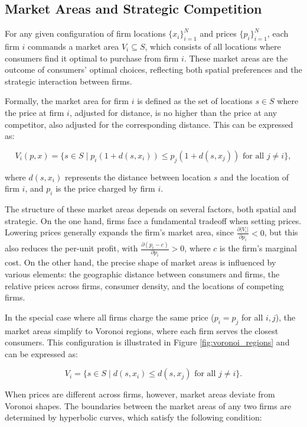 \subsection{Market Areas and Strategic Competition}

For any given configuration of firm locations $\{x_i\}_{i=1}^N$ and prices $\{p_i\}_{i=1}^N$, each firm $i$ commands a market area $V_i \subseteq S$, which consists of all locations where consumers find it optimal to purchase from firm $i$. These market areas are the outcome of consumers' optimal choices, reflecting both spatial preferences and the strategic interaction between firms.

Formally, the market area for firm $i$ is defined as the set of locations $s \in S$ where the price at firm $i$, adjusted for distance, is no higher than the price at any competitor, also adjusted for the corresponding distance. This can be expressed as:

\[
V_i(p,x) = \{ s \in S \mid p_i(1 + d(s,x_i)) \leq p_j(1 + d(s,x_j)) \text{ for all } j \neq i \},
\]

where $d(s, x_i)$ represents the distance between location $s$ and the location of firm $i$, and $p_i$ is the price charged by firm $i$.

The structure of these market areas depends on several factors, both spatial and strategic. On the one hand, firms face a fundamental tradeoff when setting prices. Lowering prices generally expands the firm's market area, since $\frac{\partial |V_i|}{\partial p_i} < 0$, but this also reduces the per-unit profit, with $\frac{\partial (p_i - c)}{\partial p_i} > 0$, where $c$ is the firm's marginal cost. On the other hand, the precise shape of market areas is influenced by various elements: the geographic distance between consumers and firms, the relative prices across firms, consumer density, and the locations of competing firms.

In the special case where all firms charge the same price ($p_i = p_j$ for all $i,j$), the market areas simplify to Voronoi regions, where each firm serves the closest consumers. This configuration is illustrated in Figure \ref{fig:voronoi_regions} and can be expressed as:

\[
V_i = \{ s \in S \mid d(s,x_i) \leq d(s,x_j) \text{ for all } j \neq i \}.
\]

When prices are different across firms, however, market areas deviate from Voronoi shapes. The boundaries between the market areas of any two firms are determined by hyperbolic curves, which satisfy the following condition:

